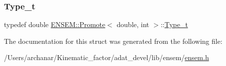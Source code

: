 \subsubsection{\texorpdfstring{Type\_t}{Type\_t}\hspace{0.1cm}{\footnotesize\ttfamily [2/2]}}
{\footnotesize\ttfamily typedef double \mbox{\hyperlink{structENSEM_1_1Promote}{E\+N\+S\+E\+M\+::\+Promote}}$<$ double, int $>$\+::\mbox{\hyperlink{structENSEM_1_1Promote_3_01double_00_01int_01_4_ae167376f3956c785560542ee33194136}{Type\+\_\+t}}}



The documentation for this struct was generated from the following file\+:\begin{DoxyCompactItemize}
\item 
/\+Users/archanar/\+Kinematic\+\_\+factor/adat\+\_\+devel/lib/ensem/\mbox{\hyperlink{lib_2ensem_2ensem_8h}{ensem.\+h}}\end{DoxyCompactItemize}
